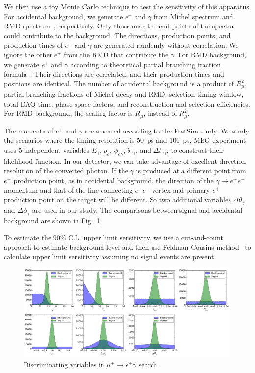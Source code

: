 We then use a toy Monte Carlo technique to test the sensitivity of this
apparatus.
For accidental background, we generate $e^+$ and $\gamma$ from Michel
spectrum and RMD spectrum~\cite{Kuno:1999jp}, respectively. Only those 
near the end points of the spectra could contribute to the background.
The directions, production points, and production times of $e^+$ and 
$\gamma$ are generated
randomly without correlation. We ignore the other $e^+$ from the RMD that
contribute the $\gamma$.
For RMD background, we generate $e^+$ and $\gamma$ according to theoretical
partial branching fraction formula~\cite{Kuno:1999jp}. Their directions are
correlated, and their production times and positions are identical.
The number of accidental background is a product of $R_\mu^2$, partial
branching fractions of Michel decay and RMD, selection timing window,
total DAQ time, phase space factors, and reconstruction and selection 
efficiencies. For RMD background, the scaling factor is $R_\mu$, instead of
$R_\mu^2$.

The momenta 
of $e^+$ and $\gamma$ are smeared according to the FastSim study. 
We study the scenarios where the timing resolution is 50~ps and 100~ps. 
MEG experiment uses 5 independent variables $E_\gamma$, $p_e$, 
$\phi_{e\gamma}$, $\theta_{e\gamma}$, and $\Delta t_{e\gamma}$, to construct
their likelihood function. In our detector, we can take advantage of excellent
direction resolution of the converted photon. If the $\gamma$ is produced
at a different point from $e^+$ production point, as in accidental background,
 the direction of the $\gamma\to e^+e^-$ momentum and that of the line
connecting $e^+e^-$ vertex and primary $e^+$ production point on the target
will be different. So two additional variables $\Delta\theta_\gamma$ 
and $\Delta\phi_\gamma$ are used in our study. The comparisons between signal
and accidental background are shown in Fig.~\ref{fig:muegamma-vars}.

To estimate the 90\% C.L. upper limit sensitivity, we use a cut-and-count
approach to estimate background level and then use Feldman-Cousins 
method~\cite{Feldman:1997qc} to calculate upper limit sensitivity assuming
no signal events are present.



\begin{figure}[htbp]
\includegraphics[width=0.99\textwidth]{Figures/sens-vardists-50ps.pdf}
\caption{Discriminating variables in $\mu^+\to e^+\gamma$ search.}
\label{fig:muegamma-vars}
\end{figure}

